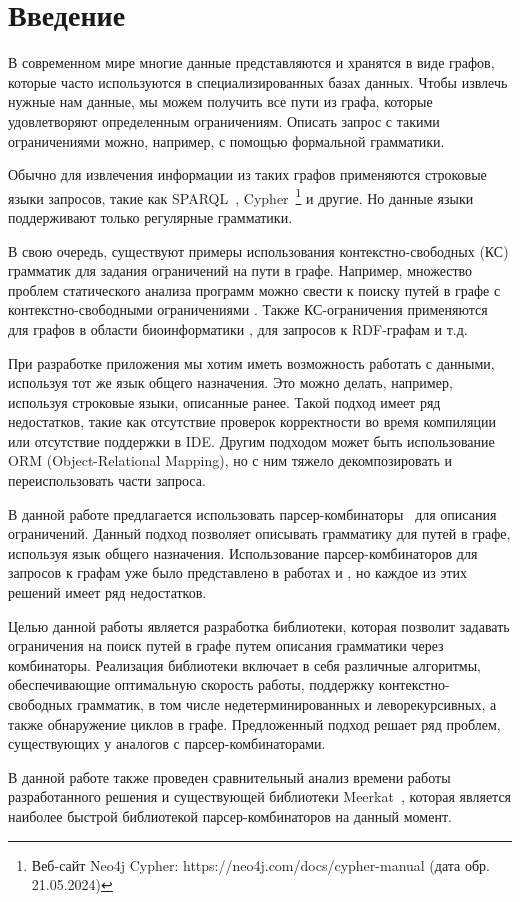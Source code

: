 \chapter*{Введение}                         %

В современном мире многие данные представляются и хранятся в виде графов, которые часто используются в специализированных базах данных. 
Чтобы извлечь нужные нам данные, мы можем получить все пути из графа, которые удовлетворяют определенным ограничениям. 
Описать запрос с такими ограничениями можно, например, с помощью формальной грамматики. 

Обычно для извлечения информации из таких графов применяются строковые языки запросов, такие как SPARQL~\cite{sparql}, Cypher~\footnote{Веб-сайт Neo4j Cypher: https://neo4j.com/docs/cypher-manual (дата обр. 21.05.2024)} и другие. Но данные языки поддерживают только регулярные грамматики.

В свою очередь, существуют примеры использования контекстно-свободных (КС) грамматик для задания ограничений на пути в графе. Например, множество проблем статического анализа программ можно свести к поиску путей в графе с контекстно-свободными ограничениями \cite{RepsProgramAnalysis}.
Также КС-ограничения применяются для графов в области биоинформатики \cite{BioinformaticsCF}, для запросов к RDF-графам \cite{RDF_CF} и т.д.

При разработке приложения мы хотим иметь возможность работать с данными, используя тот же язык общего назначения. 
Это можно делать, например, используя строковые языки, описанные ранее. Такой подход имеет ряд недостатков, такие как отсутствие проверок корректности во время компиляции или отсутствие поддержки в IDE. Другим подходом может быть использование ORM (Object-Relational Mapping), но с ним тяжело декомпозировать и переиспользовать части запроса.

В данной работе предлагается использовать парсер-комбинаторы~\cite{Hutton_1992} для описания ограничений. Данный подход позволяет описывать грамматику для путей в графе, используя язык общего назначения. Использование парсер-комбинаторов для запросов к графам уже было представлено в работах \cite{Trails} и \cite{MeerkatGraphs}, но каждое из этих решений имеет ряд недостатков. 

Целью данной работы является разработка библиотеки, которая позволит задавать ограничения на поиск путей в графе путем описания грамматики через комбинаторы. Реализация библиотеки включает в себя различные алгоритмы, обеспечивающие оптимальную скорость работы, поддержку контекстно-свободных грамматик, в том числе недетерминированных и леворекурсивных, а также обнаружение циклов в графе. Предложенный подход решает ряд проблем, существующих у аналогов с парсер-комбинаторами.

В данной работе также проведен сравнительный анализ времени работы разработанного решения и существующей библиотеки Meerkat~\cite{MeerkatGraphs}, которая является наиболее быстрой библиотекой парсер-комбинаторов на данный момент. 